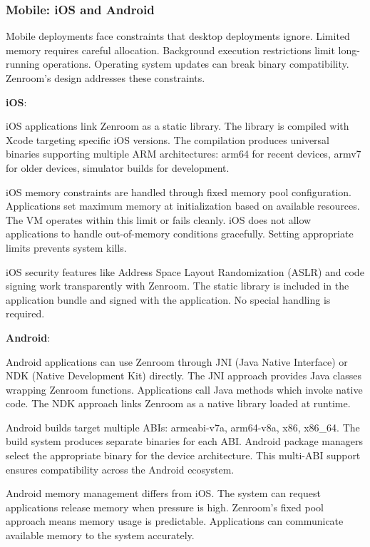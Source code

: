 \subsubsection{Mobile: iOS and Android}

Mobile deployments face constraints that desktop deployments
ignore. Limited memory requires careful allocation. Background
execution restrictions limit long-running operations. Operating system
updates can break binary compatibility. Zenroom's design addresses
these constraints.

\textbf{iOS}:

iOS applications link Zenroom as a static library. The library is
compiled with Xcode targeting specific iOS versions. The compilation
produces universal binaries supporting multiple ARM architectures:
arm64 for recent devices, armv7 for older devices, simulator builds
for development.

iOS memory constraints are handled through fixed memory pool
configuration. Applications set maximum memory at initialization based
on available resources. The VM operates within this limit or fails
cleanly. iOS does not allow applications to handle out-of-memory
conditions gracefully. Setting appropriate limits prevents system
kills.

iOS security features like Address Space Layout Randomization (ASLR)
and code signing work transparently with Zenroom. The static library
is included in the application bundle and signed with the
application. No special handling is required.

\textbf{Android}:

Android applications can use Zenroom through JNI (Java Native
Interface) or NDK (Native Development Kit) directly. The JNI approach
provides Java classes wrapping Zenroom functions. Applications call
Java methods which invoke native code. The NDK approach links Zenroom
as a native library loaded at runtime.

Android builds target multiple ABIs: armeabi-v7a, arm64-v8a, x86,
x86\_64. The build system produces separate binaries for each
ABI. Android package managers select the appropriate binary for the
device architecture. This multi-ABI support ensures compatibility
across the Android ecosystem.

Android memory management differs from iOS. The system can request
applications release memory when pressure is high. Zenroom's fixed
pool approach means memory usage is predictable. Applications can
communicate available memory to the system accurately.

